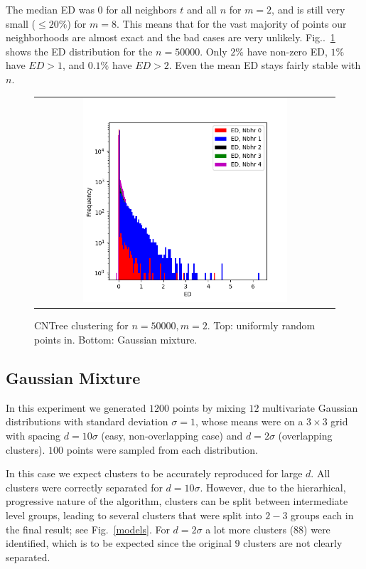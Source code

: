 \documentclass[11pt]{article}
\begin{document}
The median ED was $0$ for all neighbors $t$ and all $n$ for $m=2$, and is still very small ($ \leq 20\%$) for $m=8$. This means that for the vast majority of points our neighborhoods are almost exact and the bad cases are very unlikely. Fig..~\ref{ed_distribution} shows the ED distribution for the $n=50000$. Only $2\%$ have non-zero ED, $1\%$ have $ED > 1$, and $0.1\%$ have $ED > 2$. Even the mean ED stays fairly stable with $n$.

\begin{figure}[htbp]
	\begin{center}
	\begin{tabular}{c}
        \includegraphics[width=0.7\textwidth]{ed_distribution} \\
    \end{tabular}
    \end{center}
	\label{ed_distribution}
	\caption{CNTree clustering for $n = 50000, m=2$. Top: uniformly random points in. Bottom: Gaussian mixture.}
\end{figure}

\subsection{Gaussian Mixture}
In this experiment we generated $1200$ points by mixing $12$ multivariate Gaussian distributions with standard deviation $\sigma=1$, whose means were on a $3 \times 3$ grid with spacing $d = 10 \sigma$ (easy, non-overlapping case) and $d=2\sigma$ (overlapping clusters). $100$ points were sampled from each distribution.

In this case we expect clusters to be accurately reproduced for large $d$. All clusters were correctly separated for $d=10\sigma$. However, due to the hierarhical, progressive nature of the algorithm, clusters can be split between intermediate level groups, leading to several clusters that were split into $2-3$ groups each in the final result; see Fig.~\ref{models}. For $d=2\sigma$ a lot more clusters ($88$) were identified, which is to be expected since the original $9$ clusters are not clearly separated.
\end{document}
